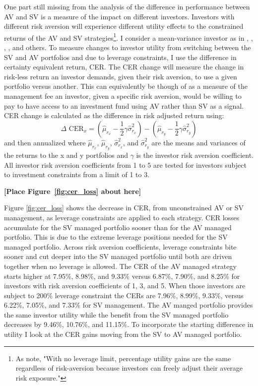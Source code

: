 One part still missing from the analysis of the difference in performance between AV and SV is a measure of the impact on different investors. Investors with different risk aversion will experience different utility effects to the constrained returns of the AV and SV strategies\footnote{As \citet{moreira_volatility-managed_2017} note, "With no leverage limit, percentage utility gains are the same regardless of risk-aversion because investors can freely adjust their average risk exposure."}. I consider a mean-variance investor as in \cite{Kandel1996}, \cite{Campbell2008}, \cite{Ferreira2011}, \cite{Rapach2016}, and others. To measure changes to investor utility from switching between the SV and AV portfolios and due to leverage constraints, I use the difference in certainty equivalent return, CER. The CER change will measure the change in risk-less return an investor demands, given their risk aversion, to use a given portfolio versus another. This can equivalently be though of as a measure of the management fee an investor, given a specific risk aversion, would be willing to pay to have access to an investment fund using AV rather than SV as a signal. CER change is calculated as the difference in risk adjusted return using:
\begin{equation}
\Delta \text{ CER}_{x} = \left(\hat \mu_{r_{x}} - \frac{1}{2}\gamma\hat \sigma^{2}_{r_{x}}\right) - \left(\hat \mu_{r_{y}} - \frac{1}{2}\gamma\hat \sigma^{2}_{r_{y}}\right)
\end{equation}
and then annualized where $\hat \mu_{r_{x}}$, $\hat \mu_{r_{y}}$, $\hat \sigma^{2}_{r_{x}}$, and $\hat \sigma^{2}_{r_{y}}$ are the means and
variances of the returns to the x and y portfolios and $\gamma$ is the investor risk aversion coefficient. %
All investor risk aversion coefficients from 1 to 5 are tested for investors subject to investment constraints from a limit of 1 to 3.%

\bigskip
\centerline{\bf [Place Figure~\ref{fig:cer_loss} about here]}
\bigskip

Figure \ref{fig:cer_loss} shows the decrease in CER, from unconstrained AV or SV management, as leverage constraints are applied to each strategy. CER losses accumulate for the SV managed portfolio sooner than for the AV managed portfolio. This is due to the extreme leverage positions needed for the SV managed portfolio. Across risk aversion coefficients, leverage constraints bite sooner and cut deeper into the SV managed portfolio until both are driven together when no leverage is allowed. The CER of the AV managed strategy starts higher at 7.95\%, 8.98\%, and 9.33\% versus 6.87\%, 7.90\%, and 8.25\% for investors with risk aversion coefficients of 1, 3, and 5. When those investors are subject to 200\% leverage constraint the CERs are 7.96\%, 8.99\%, 9.33\%, versus 6.22\%, 7.05\%, and 7.33\% for SV management. The AV manged portfolio provides the same investor utility while the benefit from the SV managed portfolio decreases by 9.46\%, 10.76\%, and 11.15\%. To incorporate the starting difference in utility I look at the CER gains moving from the SV to AV managed portfolio. 


